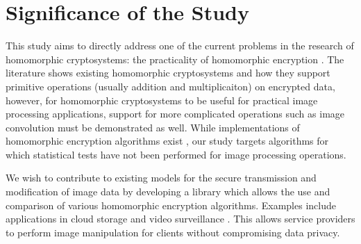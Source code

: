 \section{Significance of the Study}

This study aims to directly address one of the current problems in the research of homomorphic cryptosystems: the practicality of homomorphic encryption \cite{sen_homomorphic_2013}. The literature shows existing homomorphic cryptosystems and how they support primitive operations (usually addition and multiplicaiton) on encrypted data, however, for homomorphic cryptosystems to be useful for practical image processing applications, support for more complicated operations such as image convolution must be demonstrated as well. While implementations of homomorphic encryption algorithms exist \cite{ziad_cryptoimg:_2016, garay_algorithms_2014}, our study targets algorithms for which statistical tests have not been performed for image processing operations.

We wish to contribute to existing models for the secure transmission and modification of image data by developing a library which allows the use and comparison of various homomorphic encryption algorithms.  Examples include applications in cloud storage \cite{potey_homomorphic_2016} and video surveillance \cite{upmanyu_efficient_2009}. This allows service providers to perform image manipulation for clients without compromising data privacy.
